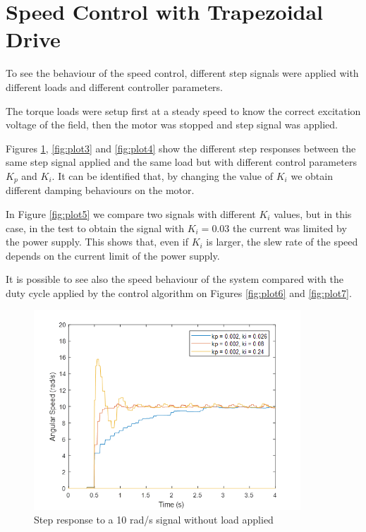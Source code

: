 \clearpage
\section{Speed Control with Trapezoidal Drive}

To see the behaviour of the speed control, different step signals were applied with different loads and different controller parameters. 

The torque loads were setup first at a steady speed to know the correct excitation voltage of the field, then the motor was stopped and step signal was applied.

Figures \ref{fig:plot2}, \ref{fig:plot3} and \ref{fig:plot4} show the different step responses between the same step signal applied and the same load but with different control parameters $K_{p}$ and $K_{i}$. It can be identified that, by changing the value of $K_{i}$ we obtain different damping behaviours on the motor.

In Figure \ref{fig:plot5} we compare two signals with different $K_{i}$ values, but in this case, in the test to obtain the signal with $K_{i} = 0.03$ the current was limited by the power supply. This shows that, even if $K_{i}$ is larger, the slew rate of the speed depends on the current limit of the power supply.

It is possible to see also the speed behaviour of the system compared with the duty cycle applied by the control algorithm on Figures \ref{fig:plot6} and \ref{fig:plot7}.

\begin{figure}[h!p]
\centering
\includegraphics[width=10cm]{Images/plots/plot_2.png} 
\caption[Step response to a 10 rad/s signal without load applied]{Step response to a 10 rad/s signal without load applied}
\label{fig:plot2}
\end{figure}

